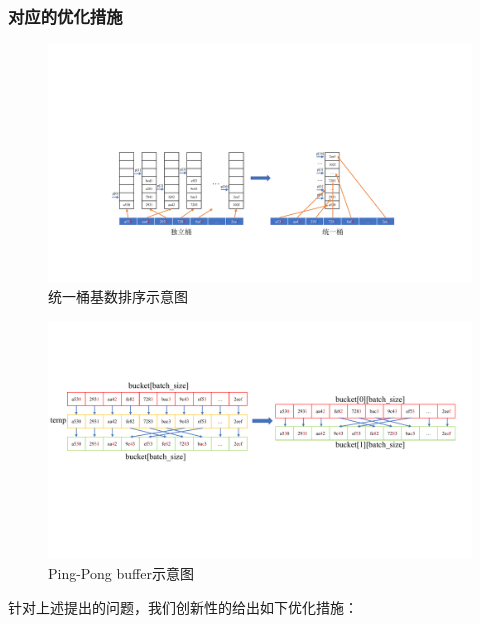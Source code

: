 \subsubsection{对应的优化措施}
\begin{figure}[htbp]
    \centering
    \includegraphics[width=\linewidth]{figures/unified_bucket.pdf}
    \caption{统一桶基数排序示意图}
    \label{fig:unified_bucket}
\end{figure}

\begin{figure}[htbp]
    \centering
    \includegraphics[width=\linewidth]{figures/pingpong_buffer.pdf}
    \caption{Ping-Pong buffer示意图}
    \label{fig:pingpong_buffer}
\end{figure}
针对上述提出的问题，我们创新性的给出如下优化措施：

